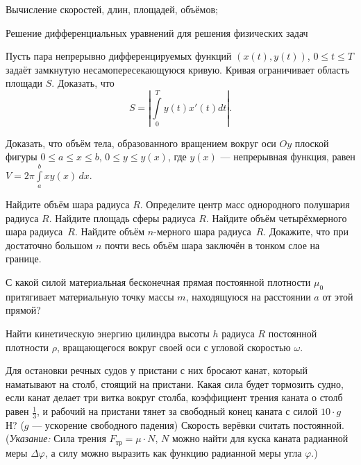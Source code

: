 \documentclass[a4paper,12pt]{article}
\begin{document}

\begin{nums}{-2}
\item Вычисление скоростей, длин, площадей, объёмов;
\item Решение дифференциальных уравнений для решения физических задач
\end{nums}


 Пусть пара непрерывно дифференцируемых функций $(x(t),y(t))$, $0\leqslant t \leqslant T$ задаёт замкнутую
несамопересекающуюся кривую. Кривая ограничивает область площади $S$.
Доказать, что
\vspace*{-3mm}
$$
S = \left| \int\limits_0^T y(t) x'(t) dt \right|.
$$
\vspace*{-7mm}

Доказать, что объём тела, образованного вращением вокруг оси $Oy$ плоской фигуры $0 \leqslant a \leqslant x \leqslant b,\, 0\leqslant y \leqslant y(x)$, где $y(x)$
--- непрерывная функция, равен $V = 2 \pi \int\limits_a^b x y(x) \, dx$.



 Найдите объём шара радиуса $R$.
 Определите центр масс однородного полушария радиуса $R$.
 Найдите площадь сферы радиуса $R$.
 Найдите объём четырёхмерного шара радиуса~$R$.
 Найдите объём $n$-мерного шара радиуса~$R$.
Докажите, что при достаточно большом $n$ почти весь объём шара заключён в тонком слое на границе.



С какой силой материальная бесконечная прямая постоянной плотности $\mu_0$ притягивает материальную точку массы $m$, находящуюся на расстоянии  $a$ от
этой прямой?

Найти кинетическую энергию цилиндра высоты $h$ радиуса $R$ постоянной плотности $\rho$, вращающегося вокруг своей оси с угловой скоростью $\omega$.

Для остановки речных судов у пристани с них бросают канат, который наматывают на столб,
стоящий на пристани. Какая сила будет тормозить судно, если канат делает три витка вокруг столба,
коэффициент трения каната о столб равен $\frac13$, и рабочий на пристани тянет за свободный конец
каната с силой $10\cdot g$ Н? ($g$ --- ускорение свободного падения) Скорость верёвки считать постоянной.\\
({\sl Указание:}
Сила трения $F_{тр} = \mu \cdot N$, $N$ можно найти для куска каната радианной меры
$\Delta \varphi$, а силу можно выразить как функцию радианной меры
угла $\varphi$.)
\end{document}
